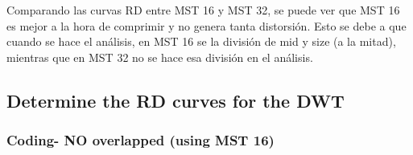 \documentclass[11pt]{article}
\begin{document}
    Comparando las curvas RD entre MST 16 y MST 32, se puede ver que MST 16
es mejor a la hora de comprimir y no genera tanta distorsión. Esto se
debe a que cuando se hace el análisis, en MST 16 se la división de mid y
size (a la mitad), mientras que en MST 32 no se hace esa división en el
análisis.

    \subsection{Determine the RD curves for the
DWT}\label{determine-the-rd-curves-for-the-dwt}

    \subsubsection{Coding- NO overlapped (using MST
16)}\label{coding--no-overlapped-using-mst-16}
\end{document}
